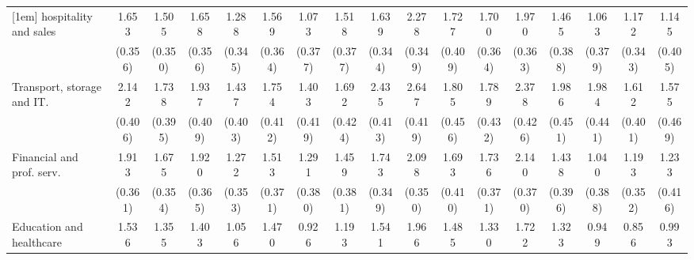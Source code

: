 {\begin{tabular}{l*{16}{c}}
[1em]
hospitality and sales&       1.653\sym{***}&       1.505\sym{***}&       1.658\sym{***}&       1.288\sym{***}&       1.569\sym{***}&       1.073\sym{**} &       1.518\sym{***}&       1.639\sym{***}&       2.278\sym{***}&       1.727\sym{***}&       1.700\sym{***}&       1.970\sym{***}&       1.465\sym{***}&       1.063\sym{**} &       1.172\sym{***}&       1.145\sym{**} \\
                    &     (0.356)         &     (0.350)         &     (0.356)         &     (0.345)         &     (0.364)         &     (0.377)         &     (0.377)         &     (0.344)         &     (0.349)         &     (0.409)         &     (0.364)         &     (0.363)         &     (0.388)         &     (0.379)         &     (0.343)         &     (0.405)         \\
[1em]
Transport, storage and IT.&       2.142\sym{***}&       1.738\sym{***}&       1.937\sym{***}&       1.437\sym{***}&       1.754\sym{***}&       1.403\sym{***}&       1.692\sym{***}&       2.435\sym{***}&       2.647\sym{***}&       1.805\sym{***}&       1.789\sym{***}&       2.378\sym{***}&       1.986\sym{***}&       1.984\sym{***}&       1.612\sym{***}&       1.575\sym{***}\\
                    &     (0.406)         &     (0.395)         &     (0.409)         &     (0.403)         &     (0.412)         &     (0.419)         &     (0.424)         &     (0.413)         &     (0.419)         &     (0.456)         &     (0.432)         &     (0.426)         &     (0.451)         &     (0.441)         &     (0.401)         &     (0.469)         \\
[1em]
Financial and prof. serv.&       1.913\sym{***}&       1.675\sym{***}&       1.920\sym{***}&       1.272\sym{***}&       1.513\sym{***}&       1.291\sym{***}&       1.459\sym{***}&       1.743\sym{***}&       2.098\sym{***}&       1.693\sym{***}&       1.736\sym{***}&       2.140\sym{***}&       1.438\sym{***}&       1.040\sym{**} &       1.193\sym{***}&       1.233\sym{**} \\
                    &     (0.361)         &     (0.354)         &     (0.365)         &     (0.353)         &     (0.371)         &     (0.380)         &     (0.381)         &     (0.349)         &     (0.350)         &     (0.410)         &     (0.371)         &     (0.370)         &     (0.396)         &     (0.388)         &     (0.352)         &     (0.416)         \\
[1em]
Education and healthcare&       1.536\sym{***}&       1.355\sym{***}&       1.403\sym{***}&       1.056\sym{**} &       1.470\sym{***}&       0.926\sym{*}  &       1.193\sym{**} &       1.541\sym{***}&       1.966\sym{***}&       1.485\sym{***}&       1.330\sym{***}&       1.722\sym{***}&       1.323\sym{***}&       0.949\sym{*}  &       0.856\sym{*}  &       0.993\sym{*}  \\

\end{tabular}}
